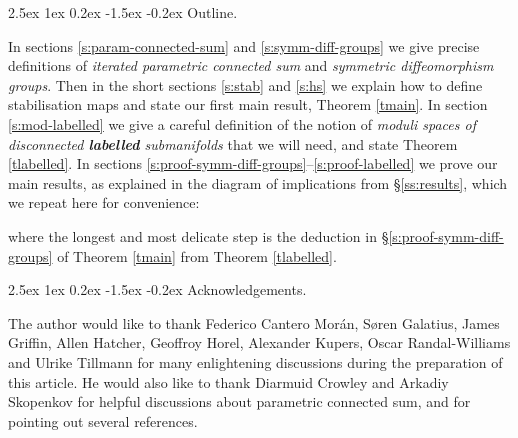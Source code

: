 \documentclass[reqno,a4paper]{article}
\makeatletter
\numberwithin{equation}{section}
\theoremstyle{italicised}
\theoremstyle{upright}
\theoremstyle{italicised-restate}
\renewcommand*{\paragraph}{\@startsection{paragraph}{4}{\z@}%
	{2.5ex \@plus 1ex \@minus 0.2ex}%
	{-1.5ex \@plus -0.2ex}%
	{\normalfont\normalsize\bfseries}}
\makeatother
\begin{document}
\paragraph{Outline.}

In sections \ref{s:param-connected-sum} and \ref{s:symm-diff-groups} we give precise definitions of \emph{iterated parametric connected sum} and \emph{symmetric diffeomorphism groups}. Then in the short sections \ref{s:stab} and \ref{s:hs} we explain how to define stabilisation maps and state our first main result, Theorem \ref{tmain}. In section \ref{s:mod-labelled} we give a careful definition of the notion of \emph{moduli spaces of disconnected \textbf{labelled} submanifolds} that we will need, and state Theorem \ref{tlabelled}. In sections \ref{s:proof-symm-diff-groups}--\ref{s:proof-labelled} we prove our main results, as explained in the diagram of implications from \S\ref{ss:results}, which we repeat here for convenience:
\begin{center}
\end{center}
where the longest and most delicate step is the deduction in \S\ref{s:proof-symm-diff-groups} of Theorem \ref{tmain} from Theorem \ref{tlabelled}.


\paragraph{Acknowledgements.}


The author would like to thank Federico Cantero Mor{\'a}n, S{\o}ren Galatius, James Griffin, Allen Hatcher, Geoffroy Horel, Alexander Kupers, Oscar Randal-Williams and Ulrike Tillmann for many enlightening discussions during the preparation of this article. He would also like to thank Diarmuid Crowley and Arkadiy Skopenkov for helpful discussions about parametric connected sum, and for pointing out several references.
\end{document}
